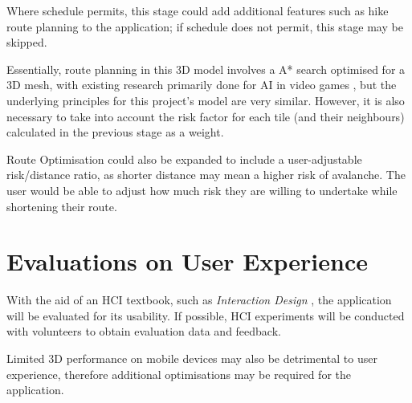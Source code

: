 \documentclass[11pt, oneside]{article}
\begin{document}
Where schedule permits, this stage could add additional features such as hike route planning to the application; if schedule does not permit, this stage may be skipped.

Essentially, route planning in this 3D model involves a A* search \cite{4082128} optimised for a 3D mesh, with existing research primarily done for AI in video games \cite{cui2011based}, but the underlying principles for this project's model are very similar. However, it is also necessary to take into account the risk factor for each tile (and their neighbours) calculated in the previous stage as a weight.

Route Optimisation could also be expanded to include a user-adjustable risk/distance ratio, as shorter distance may mean a higher risk of avalanche. The user would be able to adjust how much risk they are willing to undertake while shortening their route.

\section{Evaluations on User Experience}

With the aid of an HCI textbook, such as \textit{Interaction Design} \cite{interaction-design}, the application will be evaluated for its usability. If possible, HCI experiments will be conducted with volunteers to obtain evaluation data and feedback.

Limited 3D performance on mobile devices may also be detrimental to user experience, therefore additional optimisations may be required for the application.


\small{}
\end{document}
